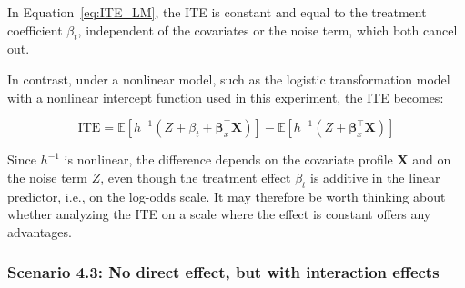 In Equation~\ref{eq:ITE_LM}, the ITE is constant and equal to the treatment coefficient $\beta_t$, independent of the covariates or the noise term, which both cancel out.

In contrast, under a nonlinear model, such as the logistic transformation model with a nonlinear intercept function used in this experiment, the ITE becomes:

\begin{equation}
\text{ITE} = \mathbb{E}[h^{-1}(Z + \beta_t + \boldsymbol{\beta}_x^\top \mathbf{X})] - \mathbb{E}[h^{-1}(Z + \boldsymbol{\beta}_x^\top \mathbf{X})]
\end{equation}

Since $h^{-1}$ is nonlinear, the difference depends on the covariate profile $\mathbf{X}$ and on the noise term $Z$, even though the treatment effect $\beta_t$ is additive in the linear predictor, i.e., on the log-odds scale. It may therefore be worth thinking about whether analyzing the ITE on a scale where the effect is constant offers any advantages.

\medskip





\clearpage 



\subsubsection{Scenario 4.3: No direct effect, but with interaction effects} \label{sec:exp4_sc3}

